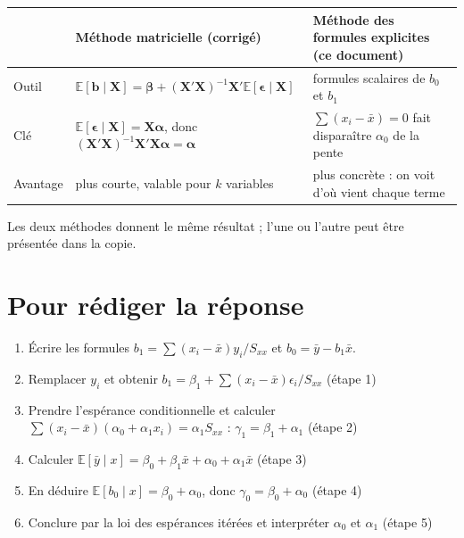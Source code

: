 \documentclass[11pt,a4paper]{article}
\newcommand{\E}{\mathbb{E}}
\newcommand{\Sxx}{S_{xx}}
\begin{document}
\begin{center}
\renewcommand{\arraystretch}{1.35}
\begin{tabular}{@{}p{2.2cm}p{5.8cm}p{5.8cm}@{}}
\toprule
& Méthode matricielle (corrigé) & Méthode des formules explicites (ce document) \\
\midrule
Outil & $\E[\mathbf b\mid\mathbf X]=\bm\beta+(\mathbf X'\mathbf X)^{-1}\mathbf X'\E[\bm\epsilon\mid\mathbf X]$ & formules scalaires de $b_0$ et $b_1$ \\
Clé & $\E[\bm\epsilon\mid\mathbf X]=\mathbf X\bm\alpha$, donc $(\mathbf X'\mathbf X)^{-1}\mathbf X'\mathbf X\bm\alpha=\bm\alpha$ & $\sum(x_i-\bar x)=0$ fait disparaître $\alpha_0$ de la pente \\
Avantage & plus courte, valable pour $k$ variables & plus concrète : on voit d'où vient chaque terme \\
\bottomrule
\end{tabular}
\end{center}
Les deux méthodes donnent le même résultat ; l'une ou l'autre peut être présentée dans la copie.

\section{Pour rédiger la réponse}

\begin{enumerate}
\item Écrire les formules $b_1=\sum(x_i-\bar x)y_i/\Sxx$ et $b_0=\bar y-b_1\bar x$.
\item Remplacer $y_i$ et obtenir $b_1=\beta_1+\sum(x_i-\bar x)\epsilon_i/\Sxx$ \hfill (étape 1)
\item Prendre l'espérance conditionnelle et calculer $\sum(x_i-\bar x)(\alpha_0+\alpha_1x_i)=\alpha_1\Sxx$ : $\gamma_1=\beta_1+\alpha_1$ \hfill (étape 2)
\item Calculer $\E[\bar y\mid x]=\beta_0+\beta_1\bar x+\alpha_0+\alpha_1\bar x$ \hfill (étape 3)
\item En déduire $\E[b_0\mid x]=\beta_0+\alpha_0$, donc $\gamma_0=\beta_0+\alpha_0$ \hfill (étape 4)
\item Conclure par la loi des espérances itérées et interpréter $\alpha_0$ et $\alpha_1$ \hfill (étape 5)
\end{enumerate}
\end{document}
